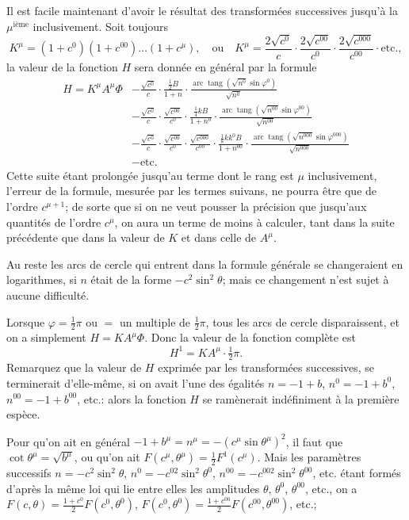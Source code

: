 \documentclass{article}
\begin{document}
Il est facile maintenant d'avoir le résultat des transformées successives jusqu'à la $\mu^{\text{ième}}$ inclusivement. Soit toujours
\[ K^{\mu}=(1+c^{0})(1+c^{00})\ldots(1+c^{\mu}),\quad\text{ou}\quad K^{\mu}=\frac{2\sqrt{c^{0}}}{c}\cdot\frac{2\sqrt{c^{00}}}{c^{0}}\cdot\frac{2\sqrt{c^{000}}}{c^{00}}\cdot\text{etc.}, \]
la valeur de la fonction $H$ sera donnée en général par la formule
\[ \begin{aligned} H=K^{\mu}A^{\mu}\Phi&-\frac{\sqrt{c^{0}}}{c}\cdot\frac{\tfrac{1}{2}B}{1+n}\cdot\frac{\operatorname{arc}\operatorname{tang}(\sqrt{n^{0}}\sin\varphi^{0})}{\sqrt{n^{0}}}\\ &-\frac{\sqrt{c^{0}}}{c}\cdot\frac{\sqrt{c^{00}}}{c^{0}}\cdot\frac{\tfrac{1}{4}kB}{1+n^{0}}\cdot\frac{\operatorname{arc}\operatorname{tang}(\sqrt{n^{00}}\sin\varphi^{00})}{\sqrt{n^{00}}}\\ &-\frac{\sqrt{c^{0}}}{c}\cdot\frac{\sqrt{c^{00}}}{c^{0}}\cdot\frac{\sqrt{c^{000}}}{c^{00}}\cdot\frac{\tfrac{1}{8}kk^{0}B}{1+n^{00}}\cdot\frac{\operatorname{arc}\operatorname{tang}(\sqrt{n^{000}}\sin\varphi^{000})}{\sqrt{n^{000}}}\\ &-\text{etc.} \end{aligned} \]
Cette suite étant prolongée jusqu'au terme dont le rang est $\mu$ inclusivement, l'erreur de la formule, mesurée par les termes suivans, ne pourra être que de l'ordre $c^{\mu+1}$; de sorte que si on ne veut pousser la précision que jusqu'aux quantités de l'ordre $c^{\mu}$, on aura un terme de moins à calculer, tant dans la suite précédente que dans la valeur de $K$ et dans celle de $A^{\mu}$.

Au reste les arcs de cercle qui entrent dans la formule générale se changeraient en logarithmes, si $n$ était de la forme $-c^{2}\sin^{2}\theta$; mais ce changement n'est sujet à aucune difficulté.

Lorsque $\varphi=\frac{1}{2}\pi$ ou $=$ un multiple de $\frac{1}{2}\pi$, tous les arcs de cercle disparaissent, et on a simplement $H=KA^{\mu}\Phi$. Donc la valeur de la fonction complète est
\[ H^{1}=KA^{\mu}\cdot\tfrac{1}{2}\pi. \]
Remarquez que la valeur de $H$ exprimée par les transformées successives, se terminerait d'elle-même, si on avait l'une des égalités $n=-1+b$, $n^{0}=-1+b^{0}$, $n^{00}=-1+b^{00}$, etc.: alors la fonction $H$ se ramènerait indéfiniment à la première espèce.

Pour qu'on ait en général $-1+b^{\mu}=n^{\mu}=-(c^{\mu}\sin\theta^{\mu})^{2}$, il faut que $\cot\theta^{\mu}=\sqrt{b^{\mu}}$, ou qu'on ait $F(c^{\mu},\theta^{\mu})=\frac{1}{2}F^{1}(c^{\mu})$. Mais les paramètres successifs $n=-c^{2}\sin^{2}\theta$, $n^{0}=-c^{02}\sin^{2}\theta^{0}$, $n^{00}=-c^{002}\sin^{2}\theta^{00}$, etc. étant formés d'après la même loi qui lie entre elles les amplitudes $\theta$, $\theta^{0}$, $\theta^{00}$, etc., on a $F(c,\theta)=\frac{1+c^{0}}{2}F(c^{0},\theta^{0})$, $F(c^{0},\theta^{0})=\frac{1+c^{00}}{2}F(c^{00},\theta^{00})$, etc.;
\end{document}
